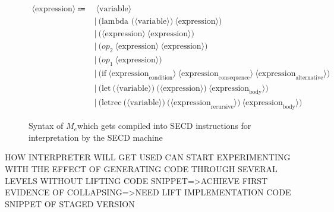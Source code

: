 \documentclass{article}
\theoremstyle{definition}
\newcommand{\mevl}{$M_{e}$}
\begin{document}
\begin{figure}[ht]
\begin{align*}
	\langle \text{expression} \rangle \Coloneqq & \: \langle \text{variable} \rangle \\
															   & | \: \text{(lambda (} \langle \text{variable} \rangle\text{)} \: \langle \text{expression} \rangle\text{)} \\
															   & | \: \text{(} \langle \text{expression} \rangle \: \langle \text{expression} \rangle \text{)} \\
															   & | \: \text{(} op_{2} \: \langle \text{expression} \rangle \: \langle \text{expression} \rangle \text{)} \\
															   & | \: \text{(} op_{1} \: \langle \text{expression} \rangle \text{)} \\
															   & | \: \text{(if} \: \langle \text{expression}_\text{condition} \rangle \: \langle \text{expression}_\text{consequence} \rangle \: \langle \text{expression}_\text{alternative} \rangle \text{)} \\
															   & | \: \text{(let} \: \text{(} \langle \text{variable} \rangle \text{)} \: \text{(}\langle \text{expression} \rangle \text{)} \: \langle \text{expression}_\text{body} \rangle \text{)} \\
															   & | \: \text{(letrec} \: \text{(} \langle \text{variable} \rangle \text{)} \: \text{(}\langle \text{expression}_\text{recursive} \rangle \text{)} \: \langle \text{expression}_\text{body} \rangle \text{)}
\end{align*}
\caption{Syntax of \mevl which gets compiled into SECD instructions for interpretation by the SECD machine}
\label{fig:mevl_syntax}
\end{figure}

HOW INTERPRETER WILL GET USED
CAN START EXPERIMENTING WITH THE EFFECT OF GENERATING CODE THROUGH SEVERAL LEVELS
WITHOUT LIFTING CODE SNIPPET=>ACHIEVE FIRST EVIDENCE  OF COLLAPSING=>NEED LIFT
IMPLEMENTATION
CODE SNIPPET OF STAGED VERSION


\end{document}
